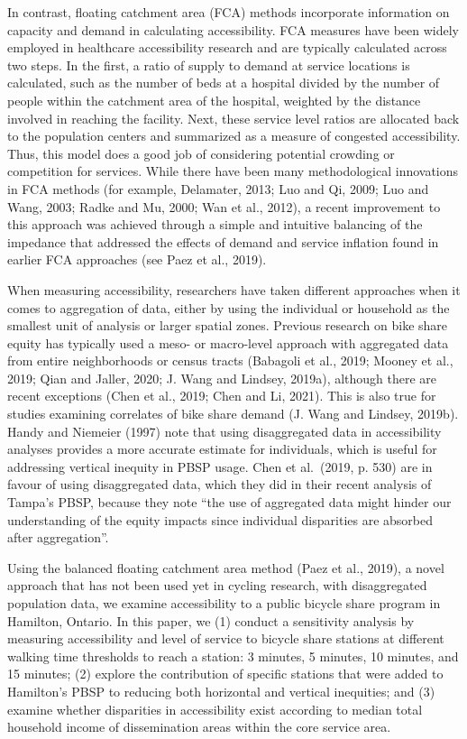 \documentclass[]{elsarticle} %
\begin{document}
In contrast, floating catchment area (FCA) methods incorporate
information on capacity and demand in calculating accessibility. FCA
measures have been widely employed in healthcare accessibility research
and are typically calculated across two steps. In the first, a ratio of
supply to demand at service locations is calculated, such as the number
of beds at a hospital divided by the number of people within the
catchment area of the hospital, weighted by the distance involved in
reaching the facility. Next, these service level ratios are allocated
back to the population centers and summarized as a measure of congested
accessibility. Thus, this model does a good job of considering potential
crowding or competition for services. While there have been many
methodological innovations in FCA methods (for example, Delamater, 2013;
Luo and Qi, 2009; Luo and Wang, 2003; Radke and Mu, 2000; Wan et al.,
2012), a recent improvement to this approach was achieved through a
simple and intuitive balancing of the impedance that addressed the
effects of demand and service inflation found in earlier FCA approaches
(see Paez et al., 2019).

When measuring accessibility, researchers have taken different
approaches when it comes to aggregation of data, either by using the
individual or household as the smallest unit of analysis or larger
spatial zones. Previous research on bike share equity has typically used
a meso- or macro-level approach with aggregated data from entire
neighborhoods or census tracts (Babagoli et al., 2019; Mooney et al.,
2019; Qian and Jaller, 2020; J. Wang and Lindsey, 2019a), although there
are recent exceptions (Chen et al., 2019; Chen and Li, 2021). This is
also true for studies examining correlates of bike share demand (J. Wang
and Lindsey, 2019b). Handy and Niemeier (1997) note that using
disaggregated data in accessibility analyses provides a more accurate
estimate for individuals, which is useful for addressing vertical
inequity in PBSP usage. Chen et al.~(2019, p. 530) are in favour of
using disaggregated data, which they did in their recent analysis of
Tampa's PBSP, because they note ``the use of aggregated data might
hinder our understanding of the equity impacts since individual
disparities are absorbed after aggregation''.

Using the balanced floating catchment area method (Paez et al., 2019), a
novel approach that has not been used yet in cycling research, with
disaggregated population data, we examine accessibility to a public
bicycle share program in Hamilton, Ontario. In this paper, we (1)
conduct a sensitivity analysis by measuring accessibility and level of
service to bicycle share stations at different walking time thresholds
to reach a station: 3 minutes, 5 minutes, 10 minutes, and 15 minutes;
(2) explore the contribution of specific stations that were added to
Hamilton's PBSP to reducing both horizontal and vertical inequities; and
(3) examine whether disparities in accessibility exist according to
median total household income of dissemination areas within the core
service area.
\end{document}
